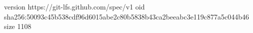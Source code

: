 version https://git-lfs.github.com/spec/v1
oid sha256:50093c45b538cdf96d6015abe2c80b5838b43ca2beeabc3e119c877a5c044b46
size 1108
